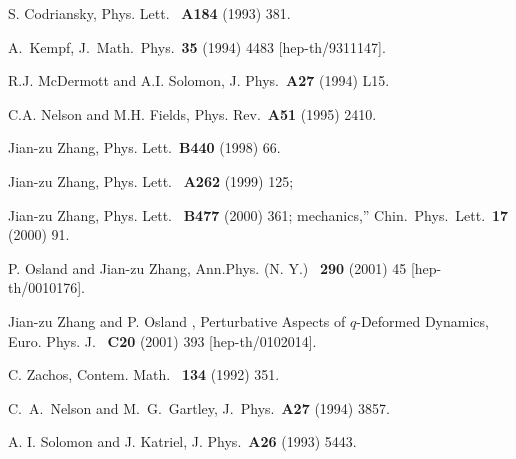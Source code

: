 \documentclass[a4paper,12pt]{article}
\begin{document}
\begin{thebibliography}{99}
S. Codriansky, Phys. Lett. \ {\bf A184} (1993) 381.

A.~Kempf,
J.\ Math.\ Phys.\ {\bf 35} (1994) 4483
[hep-th/9311147].

R.J. McDermott and A.I. Solomon, J. Phys.\ {\bf A27} (1994) L15.

C.A. Nelson and M.H. Fields, Phys. Rev.\ {\bf A51} (1995) 2410.

Jian-zu Zhang, Phys. Lett.\ {\bf B440} (1998) 66.

Jian-zu Zhang, Phys. Lett. \ {\bf A262} (1999) 125;

Jian-zu Zhang, Phys. Lett. \ {\bf B477} (2000) 361;
mechanics,''
Chin.\ Phys.\ Lett.\ {\bf 17} (2000) 91.

P. Osland and Jian-zu Zhang, 
Ann.Phys. (N. Y.) \ {\bf 290} (2001) 45
[hep-th/0010176].

Jian-zu Zhang and P. Osland ,  Perturbative Aspects of $q$-Deformed Dynamics,
  Euro. Phys. J.  \ {\bf C20} (2001) 393
[hep-th/0102014].

C. Zachos, Contem. Math. \ {\bf 134} (1992) 351.

C.~A.~Nelson and M.~G.~Gartley,
J.\ Phys.\ {\bf A27} (1994) 3857.

A. I. Solomon and J. Katriel, J. Phys.\ {\bf  A26} (1993) 5443.
\end{thebibliography}
\end{document}

